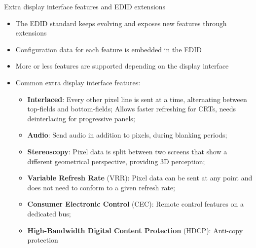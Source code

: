 \begin{frame}{Extra display interface features and EDID extensions}
  \begin{itemize}
  \item The EDID standard keeps evolving and exposes new features through extensions
  \item Configuration data for each feature is embedded in the EDID
  \item More or less features are supported depending on the display interface
  \item Common extra display interface features:
    \begin{itemize}
    \item \textbf{Interlaced}: Every other pixel line is sent at a time, alternating between top-fields and bottom-fields; Allows faster refreshing for CRTs, needs deinterlacing for progressive panels;
    \item \textbf{Audio}: Send audio in addition to pixels, during blanking periods;
    \item \textbf{Stereoscopy}: Pixel data is split between two screens that show a different geometrical perspective, providing 3D perception;
    \item \textbf{Variable Refresh Rate} (VRR): Pixel data can be sent at any point and does not need to conform to a given refresh rate;
    \item \textbf{Consumer Electronic Control} (CEC): Remote control features on a dedicated bus;
    \item \textbf{High-Bandwidth Digital Content Protection} (HDCP): Anti-copy protection
    \end{itemize}
  \end{itemize}
\end{frame}

